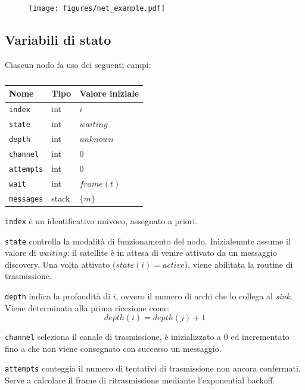 \documentclass[a4paper,12pt]{article}
\theoremstyle{definition}
\begin{document}
\begin{figure}[H]
\centering
\texttt{[image: figures/net\_example.pdf]}
\caption{}
\end{figure}

\subsection{Variabili di stato}

Ciascun nodo fa uso dei seguenti campi:

\begin{table}[H]
\centering
\begin{tabular}{| l | l | l |}
\multicolumn{1}{l}{Nome} &
\multicolumn{1}{l}{Tipo} &
\multicolumn{1}{l}{Valore iniziale} \\ \hline
\texttt{index} & int & $i$ \\ \hline
\texttt{state} & int & $waiting$ \\ \hline
\texttt{depth} & int & $unknown$ \\ \hline
\texttt{channel} & int & $0$ \\ \hline
\texttt{attempts} & int & $0$ \\ \hline
\texttt{wait} & int & $frame(t)$ \\ \hline
\texttt{messages} & stack & $\{m\}$ \\ \hline
\end{tabular}
\caption{}
\end{table}

\texttt{index} è un identificativo univoco, assegnato a priori.

\texttt{state} controlla la modalità di funzionamento del nodo. Inizialemnte assume il valore di $waiting$: il satellite è in attesa di venire attivato da un messaggio discovery. Una volta attivato ($state(i) = active$), viene abilitata la routine di trasmissione.

\texttt{depth} indica la profondità di $i$, ovvero il numero di archi che lo collega al \emph{sink}. Viene determinata alla prima ricezione come:
\begin{equation*}
depth(i) = depth(j) + 1
\end{equation*}

\texttt{channel} seleziona il canale di trasmissione, è inizializzato a $0$ ed incrementato fino a che non viene consegnato con successo un messaggio.

\texttt{attempts} conteggia il numero di tentativi di trasmissione non ancora confermati. Serve a calcolare il frame di ritrasmissione mediante l'exponential backoff.
\end{document}
